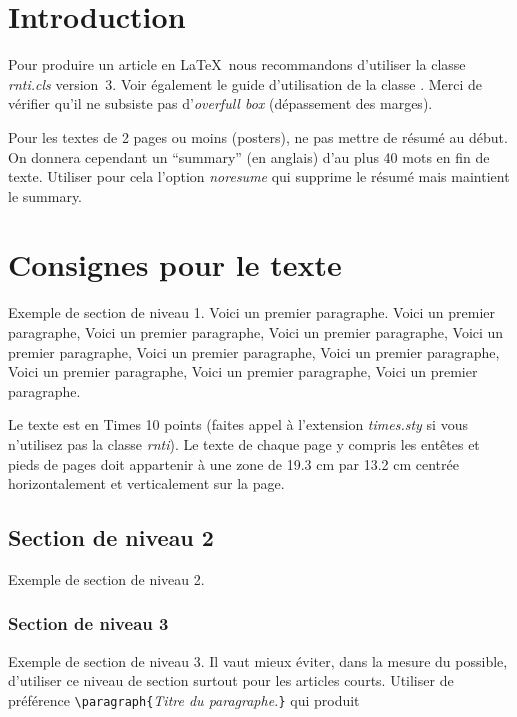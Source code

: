 \documentclass[a4paper,pagenum,french,showlayout]{rnti}
\affiliation{
    \affil{1}Adresse postale complète\\
          adresse@email,\\
          \http{http://www.une-page.html}\\
    \affil{2}Autre adresse\\
          autre-adresse@email\\
          \http{http://www.une-autre-page.html}\\
    \affil{3}Encore une autre adresse\\
          encore-une-autre-adresse@email
 }
\begin{document}
%
\section{Introduction}

Pour produire un article en \LaTeX\ nous recommandons d'utiliser la
classe \textit{rnti.cls} version~3. Voir également le guide
d'utilisation de la classe \citep{ritschard:2005rnti}. Merci de
vérifier qu'il ne subsiste pas d'\emph{overfull box} (dépassement
des marges).

Pour les textes de 2 pages ou moins (posters), ne pas mettre de
résumé au début. On donnera cependant un ``summary'' (en anglais)
d'au plus 40 mots en fin de texte. Utiliser pour cela l'option
\textit{noresume} qui supprime le résumé mais maintient le summary.

\section{Consignes pour le texte}

Exemple de section de niveau 1.  Voici un premier paragraphe. Voici
un premier paragraphe, Voici un premier paragraphe, Voici un premier
paragraphe, Voici un premier paragraphe, Voici un premier
paragraphe, Voici un premier paragraphe, Voici un premier
paragraphe, Voici un premier paragraphe, Voici un premier
paragraphe.

Le texte est en Times 10 points (faites appel à l'extension
\textit{times.sty} si vous n'utilisez pas la classe \textit{rnti}).
Le texte de chaque page y compris les entêtes et pieds de pages doit
appartenir à une zone de 19.3 cm par 13.2 cm centrée horizontalement
et verticalement sur la page.


\subsection{Section de niveau 2}

Exemple de section de niveau 2.


\subsubsection{Section de niveau 3}

Exemple de section de niveau 3. Il vaut mieux éviter, dans la mesure
du possible, d'utiliser ce niveau de section surtout pour les
articles courts. Utiliser de préférence
\verb+\paragraph{+\textit{Titre du paragraphe.}\verb+}+ qui produit
\end{document}
